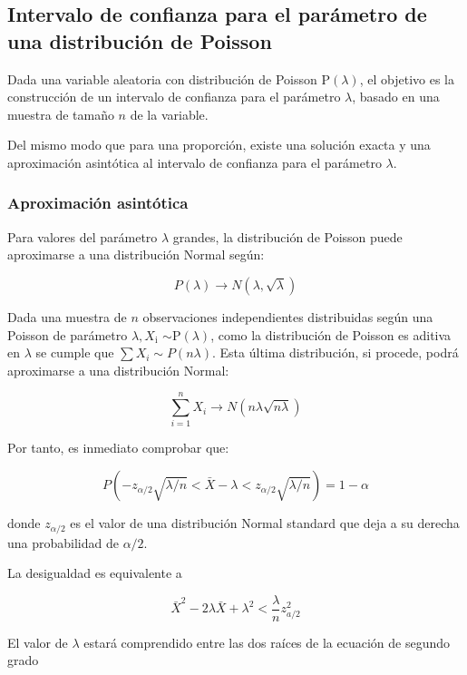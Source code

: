 \documentclass[
]{article}
\begin{document}
\subsection{Intervalo de confianza para el parámetro de una distribución de Poisson}\label{intervalo-de-confianza-para-el-paruxe1metro-de-una-distribuciuxf3n-de-poisson}

Dada una variable aleatoria con distribución de Poisson \(\mathrm{P}(\lambda)\), el objetivo es la construcción de un intervalo de confianza para el parámetro \(\lambda\), basado en una muestra de tamaño \(n\) de la variable.

Del mismo modo que para una proporción, existe una solución exacta y una aproximación asintótica al intervalo de confianza para el parámetro \(\lambda\).

\subsubsection{Aproximación asintótica}\label{aproximaciuxf3n-asintuxf3tica-1}

Para valores del parámetro \(\lambda\) grandes, la distribución de Poisson puede aproximarse a una distribución Normal según:

\[
P(\lambda) \rightarrow N(\lambda, \sqrt{\lambda})
\]

Dada una muestra de \(n\) observaciones independientes distribuidas según una Poisson de parámetro \(\lambda, X_{\mathrm{i}}\) \(\sim \mathrm{P}(\lambda)\), como la distribución de Poisson es aditiva en \(\lambda\) se cumple que \(\sum X_{i} \sim P(n \lambda)\). Esta última distribución, si procede, podrá aproximarse a una distribución Normal:

\[
\sum_{i=1}^{n} X_{i} \rightarrow N(n \lambda \sqrt{n \lambda})
\]

Por tanto, es inmediato comprobar que:

\[
P\left(-z_{\alpha / 2} \sqrt{\lambda / n}<\bar{X}-\lambda<z_{\alpha / 2} \sqrt{\lambda / n}\right)=1-\alpha
\]

donde \(z_{\alpha / 2}\) es el valor de una distribución Normal standard que deja a su derecha una probabilidad de \(\alpha / 2\).

La desigualdad es equivalente a

\[
\bar{X}^{2}-2 \lambda \bar{X}+\lambda^{2}<\frac{\lambda}{n} z_{a / 2}^{2}
\]

El valor de \(\lambda\) estará comprendido entre las dos raíces de la ecuación de segundo grado
\end{document}
